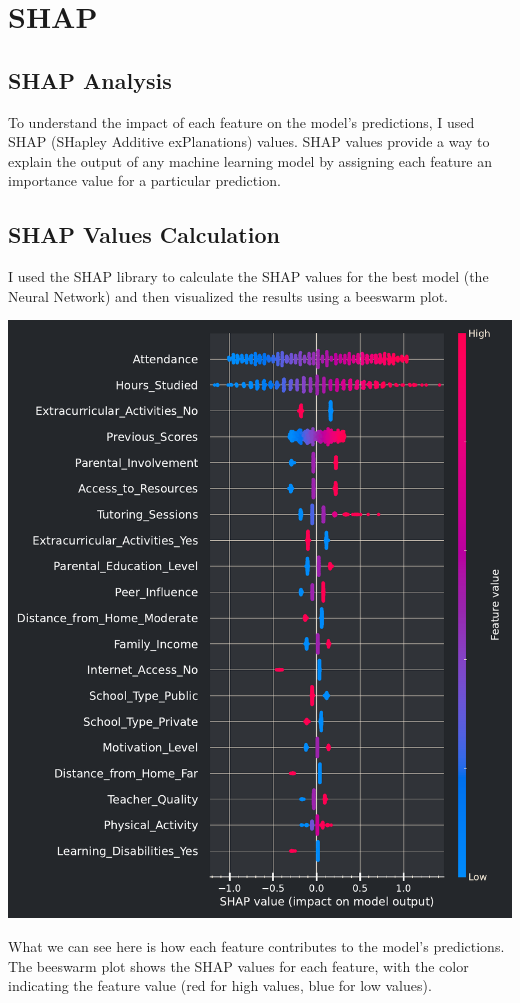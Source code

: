 \documentclass{assignment}
\begin{document}
\newpage
\section{SHAP}
\subsection{SHAP Analysis}
To understand the impact of each feature on the model's predictions, I used SHAP (SHapley Additive exPlanations) values.
SHAP values provide a way to explain the output of any machine learning model by assigning each feature an importance value for a particular prediction.

\subsection{SHAP Values Calculation}
I used the SHAP library to calculate the SHAP values for the best model (the Neural Network) and then visualized the results using a beeswarm plot.

\begin{center}
    \includegraphics[width=5.5in]{../report/assets/SHAP_values_beeswarm.pdf}
\end{center}
What we can see here is how each feature contributes to the model's predictions.
The beeswarm plot shows the SHAP values for each feature, with the color indicating the feature value (red for high values, blue for low values).
\end{document}

